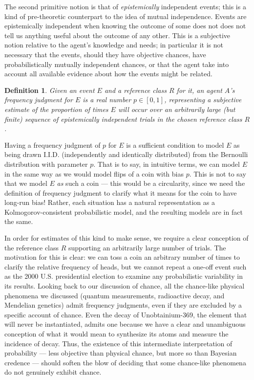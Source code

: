 \documentclass[letterpaper,12pt]{article}
\newtheorem{definition}{Definition}
\begin{document}
The second primitive notion is that of \emph{epistemically} independent events; this is a kind of pre-theoretic counterpart to the idea of mutual independence. Events are epistemically independent when knowing the outcome of some does not does not tell us anything useful about the outcome of any other. This is a subjective notion relative to the agent's knowledge and needs; in particular it is not necessary that the events, should they have objective chances, have probabilistically mutually independent chances, or that the agent take into account all available evidence about how the events might be related.

\begin{definition}
Given an event $E$ and a reference class $R$ for it, an agent $A$'s frequency judgment for $E$ is a real number $p \in [0, 1]$, representing a subjective estimate of the proportion of times $E$ will occur over an arbitrarily large (but finite) sequence of epistemically independent trials in the chosen reference class $R$.
\end{definition}

Having a frequency judgment of $p$ for $E$ is a sufficient condition to model $E$ as being drawn I.I.D. (independently and identically distributed) from the Bernoulli distribution with parameter $p$. That is to say, in intuitive terms, we can model $E$ in the same way as we would model flips of a coin with bias $p$. This is not to say that we model $E$ \emph{as} such a coin --- this would be a circularity, since we need the definition of frequency judgment to clarify what it means for the coin to have long-run bias! Rather, each situation has a natural representation as a Kolmogorov-consistent probabilistic model, and the resulting models are in fact the same.

In order for estimates of this kind to make sense, we require a clear conception of the reference class $R$ supporting an arbitrarily large number of trials. The motivation for this is clear: we can toss a coin an arbitrary number of times to clarify the relative frequency of heads, but we cannot repeat a one-off event such as the 2000 U.S. presidential election to examine any probabilistic variability in its results. Looking back to our discussion of chance, all the chance-like physical phenomena we discussed (quantum measurements, radioactive decay, and Mendelian genetics) admit frequency judgments, even if they are excluded by a specific account of chance. Even the decay of Unobtainium-369, the element that will never be instantiated, admits one because we have a clear and unambiguous conception of what it would mean to synthesize its atoms and measure the incidence of decay. Thus, the existence of this intermediate interpretation of probability --- less objective than physical chance, but more so than Bayesian credence --- should soften the blow of deciding that some chance-like phenomena do not genuinely exhibit chance.
\end{document}
